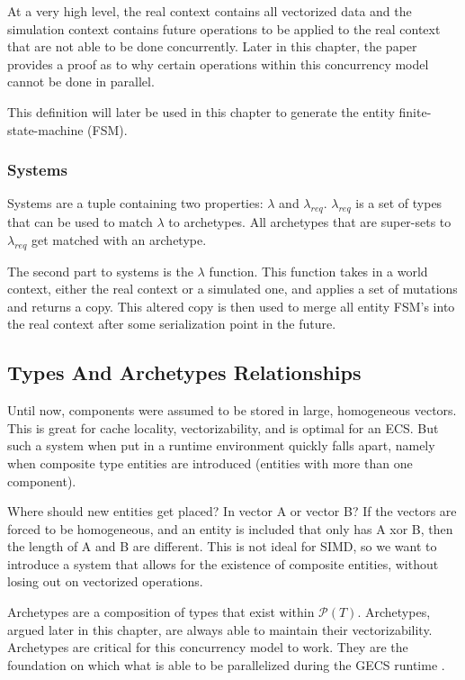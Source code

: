 At a very high level, the real context contains all vectorized data and the simulation context contains future operations to be applied to the real context that are not able to be done concurrently. Later in this chapter, the paper provides a proof as to why certain operations within this concurrency model cannot be done in parallel. 

This definition will later be used in this chapter to generate the entity finite-state-machine (FSM).

\subsubsection{Systems}
Systems are a tuple containing two properties: $\lambda$ and $\lambda_{req}$. $\lambda_{req}$ is a set of types that can be used to match $\lambda$ to archetypes. All archetypes that are super-sets to $\lambda_{req}$ get matched with an archetype.

The second part to systems is the $\lambda$ function. This function takes in a world context, either the real context or a simulated one, and applies a set of mutations and returns a copy. This altered copy is then used to merge all entity FSM's into the real context after some serialization point in the future.

\subsection{Types And Archetypes Relationships}
Until now, components were assumed to be stored in large, homogeneous vectors. This is great for cache locality, vectorizability, and is optimal for an ECS. But such a system when put in a runtime environment quickly falls apart, namely when composite type entities are introduced (entities with more than one component). 

Where should new entities get placed? In vector A or vector B? If the vectors are forced to be homogeneous, and an entity is included that only has A xor B, then the length of A and B are different. This is not ideal for SIMD, so we want to introduce a system that allows for the existence of composite entities, without losing out on vectorized operations.

Archetypes are a composition of types that exist within $\mathcal{P}(T)$. Archetypes, argued later in this chapter, are always able to maintain their vectorizability. Archetypes are critical for this concurrency model to work. They are the foundation on which what is able to be parallelized during the GECS runtime \cite{SanderMertensECS}.

